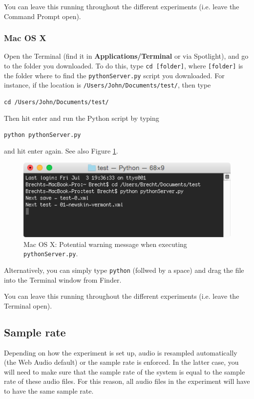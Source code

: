 \documentclass[11pt, oneside]{article}   	%
\begin{document}
                You can leave this running throughout the different experiments (i.e. leave the Command Prompt open). 
                
		
		\subsubsection{Mac OS X}
		Open the Terminal (find it in \textbf{Applications/Terminal} or via Spotlight), and go to the folder you downloaded. To do this, type \texttt{cd [folder]}, where \texttt{[folder]} is the folder where to find the \texttt{pythonServer.py} script you downloaded. For instance, if the location is \texttt{/Users/John/Documents/test/}, then type
		
			\texttt{cd /Users/John/Documents/test/}
			
		Then hit enter and run the Python script by typing

			\texttt{python pythonServer.py}

		and hit enter again. See also Figure \ref{fig:terminal}.
		
		\begin{figure}[htbp]
                \begin{center}
                \includegraphics[width=.75\textwidth]{pythonServer.png}
                \caption{Mac OS X: Potential warning message when executing \texttt{pythonServer.py}.}
                \label{fig:terminal}
                \end{center}
                \end{figure}
		
		Alternatively, you can simply type \texttt{python} (follwed by a space) and drag the file into the Terminal window from Finder. %
		
		You can leave this running throughout the different experiments (i.e. leave the Terminal open). 
		
		
	\subsection{Sample rate}
		Depending on how the experiment is set up, audio is resampled automatically (the Web Audio default) or the sample rate is enforced. In the latter case, you will need to make sure that the sample rate of the system is equal to the sample rate of these audio files. For this reason, all audio files in the experiment will have to have the same sample rate. 
		
\end{document}
